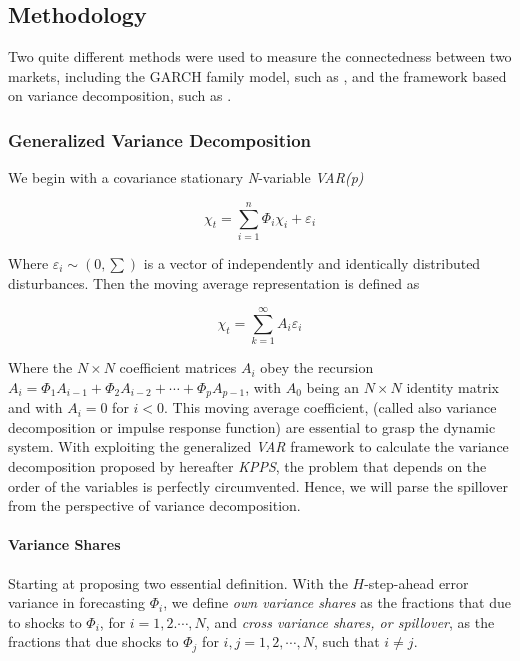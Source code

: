 \documentclass[review]{elsarticle}
\begin{document}
\subsection{Methodology}
Two quite different methods were used to measure the connectedness between two markets, including the GARCH family model, such as \cite{Baur2018,Vidal-Tomas2018,symitsi2018return}, and the framework based on variance decomposition, such as \cite{trabelsi2018there,awartani2013dynamic}.


\subsubsection{Generalized Variance Decomposition}
We begin with a covariance stationary \emph{N}-variable \emph{VAR(p)}

\begin{equation}
	\chi_t = \sum\limits_{i=1}^n \Phi_i \chi_i + \varepsilon_i 
\end{equation}

Where $\varepsilon_i \sim (0, \sum)$ is a vector of independently and identically distributed disturbances. Then the moving average representation is defined as

\begin{equation}
	\chi_t = \sum \limits_{k=1}^\infty A_i \varepsilon_i 
\end{equation}

Where the $N \times N$ coefficient matrices $A_i$ obey the recursion $A_i = \Phi_1 A_{i-1} +\Phi_2 A_{i-2} + \cdots + \Phi_p A_{p-1}$, with $A_0$ being an $N \times N$ identity matrix and with $A_i=0$ for $i < 0$. This moving average coefficient, (called also variance decomposition or impulse response function) are essential to grasp the dynamic system. With exploiting the generalized \emph{VAR} framework to calculate the variance decomposition proposed by \cite{Koop1996, pesaran1998generalized} hereafter \emph{KPPS}, the problem that depends on the order of the variables is perfectly circumvented. Hence, we will parse the spillover from the perspective of variance decomposition.

\paragraph{Variance Shares} Starting at proposing two essential definition. With the $H$-step-ahead error variance in forecasting $\Phi_i$, we define \emph{own variance shares} as the fractions that due to shocks to $\Phi_i$, for $i=1,2.\cdots,N$, and \emph{cross variance shares, or spillover}, as the fractions that due shocks to $\Phi_j$ for $i,j=1,2,\cdots,N$, such that $i \neq j$.
\end{document}
